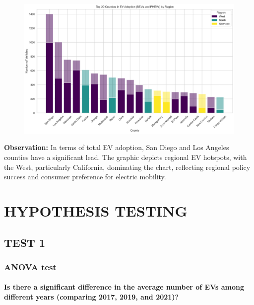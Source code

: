 \documentclass[
  letterpaper,
  DIV=11,
  numbers=noendperiod]{scrartcl}
\let\oldparagraph\paragraph
\renewcommand{\paragraph}[1]{\oldparagraph{#1}\mbox{}}
\begin{document}
\begin{figure}[H]

{\centering \includegraphics{SummaryPaper_FinalProject_T1_files/figure-pdf/cell-18-output-1.png}

}

\end{figure}

\textbf{Observation:} In terms of total EV adoption, San Diego and Los
Angeles counties have a significant lead. The graphic depicts regional
EV hotspots, with the West, particularly California, dominating the
chart, reflecting regional policy success and consumer preference for
electric mobility.

\hypertarget{hypothesis-testing}{%
\section{HYPOTHESIS TESTING}\label{hypothesis-testing}}

\hypertarget{test-1}{%
\subsection{TEST 1}\label{test-1}}

\hypertarget{anova-test}{%
\subsubsection{ANOVA test}\label{anova-test}}

\hypertarget{is-there-a-significant-difference-in-the-average-number-of-evs-among-different-years-comparing-2017-2019-and-2021}{%
\paragraph{Is there a significant difference in the average number of
EVs among different years (comparing 2017, 2019, and
2021)?}\label{is-there-a-significant-difference-in-the-average-number-of-evs-among-different-years-comparing-2017-2019-and-2021}}
\end{document}

